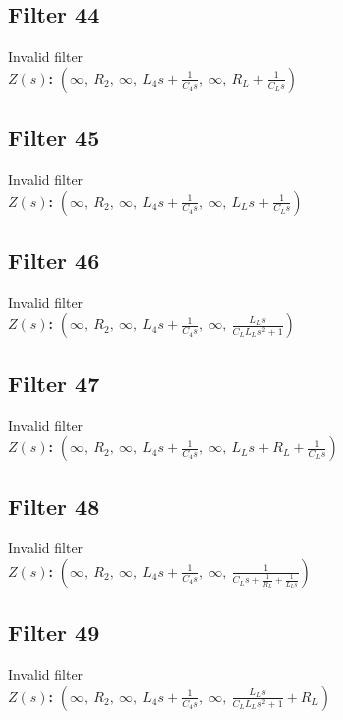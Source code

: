 \documentclass{article}
\begin{document}
\subsection*{Filter 44}
Invalid filter \\ 
\textbf{$Z(s)$:} $\left( \infty, \  R_{2}, \  \infty, \  L_{4} s + \frac{1}{C_{4} s}, \  \infty, \  R_{L} + \frac{1}{C_{L} s}\right)$ \\ 
\subsection*{Filter 45}
Invalid filter \\ 
\textbf{$Z(s)$:} $\left( \infty, \  R_{2}, \  \infty, \  L_{4} s + \frac{1}{C_{4} s}, \  \infty, \  L_{L} s + \frac{1}{C_{L} s}\right)$ \\ 
\subsection*{Filter 46}
Invalid filter \\ 
\textbf{$Z(s)$:} $\left( \infty, \  R_{2}, \  \infty, \  L_{4} s + \frac{1}{C_{4} s}, \  \infty, \  \frac{L_{L} s}{C_{L} L_{L} s^{2} + 1}\right)$ \\ 
\subsection*{Filter 47}
Invalid filter \\ 
\textbf{$Z(s)$:} $\left( \infty, \  R_{2}, \  \infty, \  L_{4} s + \frac{1}{C_{4} s}, \  \infty, \  L_{L} s + R_{L} + \frac{1}{C_{L} s}\right)$ \\ 
\subsection*{Filter 48}
Invalid filter \\ 
\textbf{$Z(s)$:} $\left( \infty, \  R_{2}, \  \infty, \  L_{4} s + \frac{1}{C_{4} s}, \  \infty, \  \frac{1}{C_{L} s + \frac{1}{R_{L}} + \frac{1}{L_{L} s}}\right)$ \\ 
\subsection*{Filter 49}
Invalid filter \\ 
\textbf{$Z(s)$:} $\left( \infty, \  R_{2}, \  \infty, \  L_{4} s + \frac{1}{C_{4} s}, \  \infty, \  \frac{L_{L} s}{C_{L} L_{L} s^{2} + 1} + R_{L}\right)$ \\ 
\end{document}
